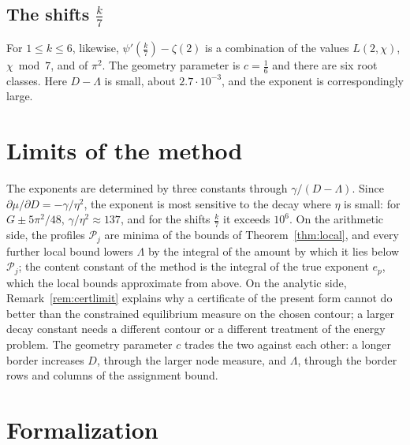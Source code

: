 \documentclass[11pt]{amsart}
\theoremstyle{definition}
\theoremstyle{remark}
\numberwithin{equation}{section}
\begin{document}
\subsection{The shifts $\frac k7$}\label{sec:sevenths}
For $1\le k\le6$, likewise, $\psi'(\frac k7)-\zeta(2)$ is a combination of the values $L(2,\chi)$, $\chi\bmod7$, and of $\pi^2$.
The geometry parameter is $c=\frac16$ and there are six root classes. Here $D-\Lambda$ is small, about $2.7\cdot10^{-3}$, and
the exponent is correspondingly large.

\section{Limits of the method}\label{sec:limits}

The exponents are determined by three constants through $\gamma/(D-\Lambda)$. Since $\partial\mu/\partial D=-\gamma/\eta^2$, the
exponent is most sensitive to the decay where $\eta$ is small: for $G\pm5\pi^2/48$, $\gamma/\eta^2\approx137$, and for the
shifts $\frac k7$ it exceeds $10^6$. On the arithmetic side, the profiles $\mathcal P_j$ are minima of the bounds of
Theorem~\ref{thm:local}, and every further local bound lowers $\Lambda$ by the integral of the amount by which it lies below
$\mathcal P_j$; the content constant of the method is the integral of the true exponent $e_p$, which the local bounds approximate
from above. On the analytic side, Remark~\ref{rem:certlimit} explains why a certificate of the present form cannot do
better than the constrained equilibrium measure on the chosen contour; a larger decay constant needs a different contour or a
different treatment of the energy problem. The geometry parameter $c$ trades the two against each other: a longer border
increases $D$, through the larger node measure, and $\Lambda$, through the border rows and columns of the assignment
bound.

\section{Formalization}\label{sec:lean}
\raggedbottom
\end{document}
